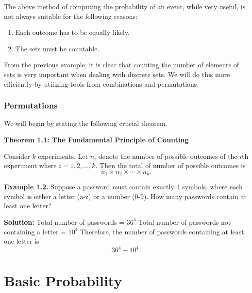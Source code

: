 \documentclass[
]{book}
\providecommand{\tightlist}{%
  \setlength{\itemsep}{0pt}\setlength{\parskip}{0pt}}
\begin{document}
The above method of computing the probability of an event, while very useful, is not always suitable for the following reasons:

\begin{enumerate}
\def\labelenumi{\arabic{enumi}.}
\tightlist
\item
  Each outcome has to be equally likely.
\item
  The sets must be countable.
\end{enumerate}

From the previous example, it is clear that counting the number of elements of sets is very important when dealing with discrete sets. We will do this more efficiently by utilizing tools from combinations and permutations.

\hypertarget{permutations}{%
\subsection{Permutations}\label{permutations}}

We will begin by stating the following crucial theorem.

\textbf{Theorem 1.1: The Fundamental Principle of Counting}

Consider \(k\) experiments. Let \(n_i\) denote the number of possible outcomes of the \(i\)th experiment where \(i=1,2,\dots,k.\) Then the total of number of possible outcomes is
\[n_1\times n_2\times\cdots\times n_k.\]

\textbf{Example 1.2.}
Suppose a password must contain exactly 4 symbols, where each symbol is either a letter (a-z) or a number (0-9). How many passwords contain at least one letter?

\textbf{Solution:}
Total number of passwords = \(36^4\)
Total number of passwords not containing a letter = \(10^4\)
Therefore, the number of passwords containing at least one letter is \[36^4-10^4.\]

\hypertarget{basic-probability}{%
\chapter{Basic Probability}\label{basic-probability}}
\end{document}
